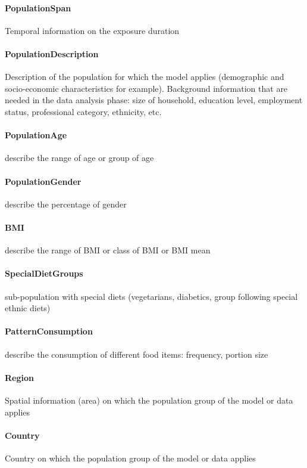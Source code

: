\documentclass[a4paper]{report}
\begin{document}
\paragraph{PopulationSpan}
Temporal information on the exposure duration

\paragraph{PopulationDescription}
Description of the population for which the model applies (demographic and socio-economic characteristics for example). Background information that are needed in the data analysis phase: size of household, education level, employment status, professional category, ethnicity, etc.

\paragraph{PopulationAge}
describe the range of age or group of age

\paragraph{PopulationGender}
describe the percentage of gender

\paragraph{BMI}
describe the range of BMI or class of BMI or BMI mean

\paragraph{SpecialDietGroups}
sub-population with special diets (vegetarians, diabetics, group following special ethnic diets)

\paragraph{PatternConsumption}
describe the consumption of different food items: frequency, portion size

\paragraph{Region}
Spatial information (area) on which the population group of the model or data applies

\paragraph{Country}
Country on which the population group of the model or data applies
\end{document}
